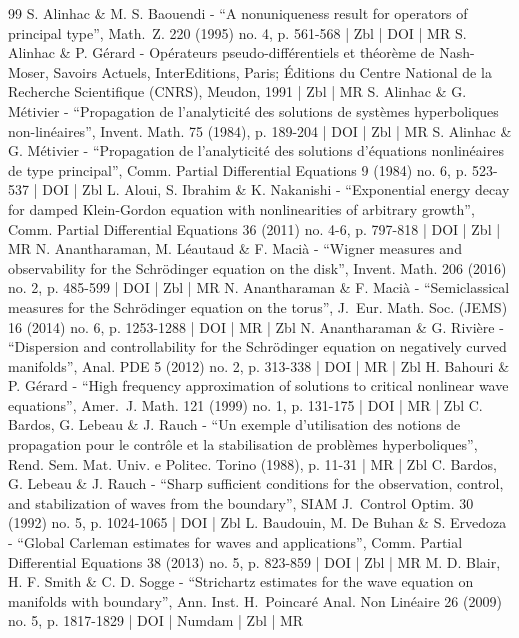 \documentclass[10pt]{amsart}
\theoremstyle{definition}
\begin{document}
\begin{thebibliography}{99}
S. Alinhac \& M. S. Baouendi - “A nonuniqueness result for operators of principal type”, Math. Z. 220 (1995) no. 4, p. 561-568 | Zbl | DOI | MR
S. Alinhac \& P. Gérard - Opérateurs pseudo-différentiels et théorème de Nash-Moser, Savoirs Actuels, InterEditions, Paris; Éditions du Centre National de la Recherche Scientifique (CNRS), Meudon, 1991 | Zbl | MR
S. Alinhac \& G. Métivier - “Propagation de l’analyticité des solutions de systèmes hyperboliques non-linéaires”, Invent. Math. 75 (1984), p. 189-204 | DOI | Zbl | MR
S. Alinhac \& G. Métivier - “Propagation de l’analyticité des solutions d’équations nonlinéaires de type principal”, Comm. Partial Differential Equations 9 (1984) no. 6, p. 523-537 | DOI | Zbl
L. Aloui, S. Ibrahim \& K. Nakanishi - “Exponential energy decay for damped Klein-Gordon equation with nonlinearities of arbitrary growth”, Comm. Partial Differential Equations 36 (2011) no. 4-6, p. 797-818 | DOI | Zbl | MR
N. Anantharaman, M. Léautaud \& F. Macià - “Wigner measures and observability for the Schrödinger equation on the disk”, Invent. Math. 206 (2016) no. 2, p. 485-599 | DOI | Zbl | MR
N. Anantharaman \& F. Macià - “Semiclassical measures for the Schrödinger equation on the torus”, J. Eur. Math. Soc. (JEMS) 16 (2014) no. 6, p. 1253-1288 | DOI | MR | Zbl
N. Anantharaman \& G. Rivière - “Dispersion and controllability for the Schrödinger equation on negatively curved manifolds”, Anal. PDE 5 (2012) no. 2, p. 313-338 | DOI | MR | Zbl
H. Bahouri \& P. Gérard - “High frequency approximation of solutions to critical nonlinear wave equations”, Amer. J. Math. 121 (1999) no. 1, p. 131-175 | DOI | MR | Zbl
C. Bardos, G. Lebeau \& J. Rauch - “Un exemple d’utilisation des notions de propagation pour le contrôle et la stabilisation de problèmes hyperboliques”, Rend. Sem. Mat. Univ. e Politec. Torino (1988), p. 11-31 | MR | Zbl
C. Bardos, G. Lebeau \& J. Rauch - “Sharp sufficient conditions for the observation, control, and stabilization of waves from the boundary”, SIAM J. Control Optim. 30 (1992) no. 5, p. 1024-1065 | DOI | Zbl
L. Baudouin, M. De Buhan \& S. Ervedoza - “Global Carleman estimates for waves and applications”, Comm. Partial Differential Equations 38 (2013) no. 5, p. 823-859 | DOI | Zbl | MR
M. D. Blair, H. F. Smith \& C. D. Sogge - “Strichartz estimates for the wave equation on manifolds with boundary”, Ann. Inst. H. Poincaré Anal. Non Linéaire 26 (2009) no. 5, p. 1817-1829 | DOI | Numdam | Zbl | MR

\end{thebibliography}
\end{document}
